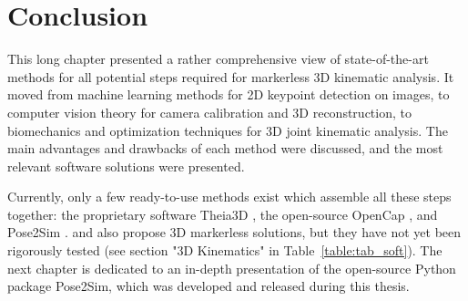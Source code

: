 \newpage

\section{Conclusion}

This long chapter presented a rather comprehensive view of state-of-the-art methods for all potential steps required for markerless 3D kinematic analysis. It moved from machine learning methods for 2D keypoint detection on images, to computer vision theory for camera calibration and 3D reconstruction, to biomechanics and optimization techniques for 3D joint kinematic analysis. The main advantages and drawbacks of each method were discussed, and the most relevant software solutions were presented. 

Currently, only a few ready-to-use methods exist which assemble all these steps together: the proprietary software Theia3D \cite{Kanko2021b}, the open-source  OpenCap \cite{Uhlrich2022}, and Pose2Sim \cite{Pagnon2022b}. \cite{Captury} and \cite{SimiShape} also propose 3D markerless solutions, but they have not yet been rigorously tested (see section "3D Kinematics" in Table~\ref{table:tab_soft}). The next chapter is dedicated to an in-depth presentation of the open-source Python package Pose2Sim, which was developed and released during this thesis. 





























